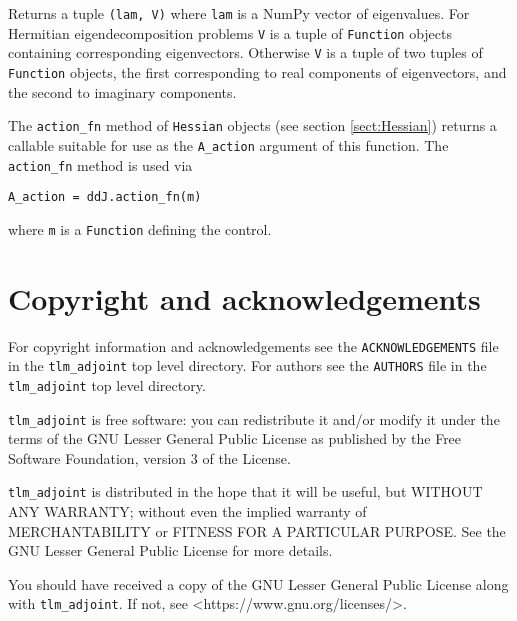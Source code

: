 \documentclass[11pt]{article}
\begin{document}
Returns a tuple \texttt{(lam, V)} where \texttt{lam} is a NumPy vector of
eigenvalues. For Hermitian eigendecomposition problems \texttt{V} is a tuple of
\texttt{Function} objects containing corresponding eigenvectors. Otherwise
\texttt{V} is a tuple of two tuples of \texttt{Function} objects, the first
corresponding to real components of eigenvectors, and the second to imaginary
components.

The \texttt{action\_fn} method of \texttt{Hessian} objects (see section
\ref{sect:Hessian}) returns a callable suitable for use as the
\texttt{A\_action} argument of this function. The \texttt{action\_fn} method is
used via
\begin{lstlisting}
A_action = ddJ.action_fn(m)
\end{lstlisting}
where \texttt{m} is a \texttt{Function} defining the control.

\section{Copyright and acknowledgements}

For copyright information and acknowledgements see the
\texttt{ACKNOWLEDGEMENTS} file in the \texttt{tlm\_adjoint} top level
directory. For authors see the \texttt{AUTHORS} file in the
\texttt{tlm\_adjoint} top level directory.

\texttt{tlm\_adjoint} is free software: you can redistribute it and/or modify
it under the terms of the GNU Lesser General Public License as published by
the Free Software Foundation, version 3 of the License.

\texttt{tlm\_adjoint} is distributed in the hope that it will be useful,
but WITHOUT ANY WARRANTY; without even the implied warranty of
MERCHANTABILITY or FITNESS FOR A PARTICULAR PURPOSE.  See the
GNU Lesser General Public License for more details.

You should have received a copy of the GNU Lesser General Public License
along with \texttt{tlm\_adjoint}.  If not, see {\textless}https://www.gnu.org/licenses/{\textgreater}.



\end{document}
